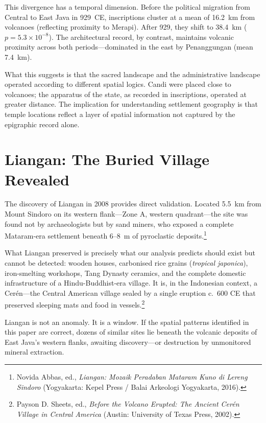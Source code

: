 \documentclass[12pt,a4paper]{article}
\begin{document}
This divergence has a temporal dimension. Before the political migration from Central to East Java in 929~CE, inscriptions cluster at a mean of 16.2~km from volcanoes (reflecting proximity to Merapi). After 929, they shift to 38.4~km ($p = 5.3 \times 10^{-8}$). The architectural record, by contrast, maintains volcanic proximity across both periods---dominated in the east by Penanggungan (mean 7.4~km).

What this suggests is that the sacred landscape and the administrative landscape operated according to different spatial logics. Candi were placed close to volcanoes; the apparatus of the state, as recorded in inscriptions, operated at greater distance. The implication for understanding settlement geography is that temple locations reflect a layer of spatial information not captured by the epigraphic record alone.

\section{Liangan: The Buried Village Revealed}

The discovery of Liangan in 2008 provides direct validation. Located 5.5~km from Mount Sindoro on its western flank---Zone A, western quadrant---the site was found not by archaeologists but by sand miners, who exposed a complete Mataram-era settlement beneath 6--8~m of pyroclastic deposits.\footnote{Novida Abbas, ed., \emph{Liangan: Mozaik Peradaban Mataram Kuno di Lereng Sindoro} (Yogyakarta: Kepel Press / Balai Arkeologi Yogyakarta, 2016).}

What Liangan preserved is precisely what our analysis predicts should exist but cannot be detected: wooden houses, carbonised rice grains (\emph{tropical japonica}), iron-smelting workshops, Tang Dynasty ceramics, and the complete domestic infrastructure of a Hindu-Buddhist-era village. It is, in the Indonesian context, a Cer\'{e}n---the Central American village sealed by a single eruption c.~600 CE that preserved sleeping mats and food in vessels.\footnote{Payson D. Sheets, ed., \emph{Before the Volcano Erupted: The Ancient Cer\'{e}n Village in Central America} (Austin: University of Texas Press, 2002).}

Liangan is not an anomaly. It is a window. If the spatial patterns identified in this paper are correct, dozens of similar sites lie beneath the volcanic deposits of East Java's western flanks, awaiting discovery---or destruction by unmonitored mineral extraction.
\end{document}
